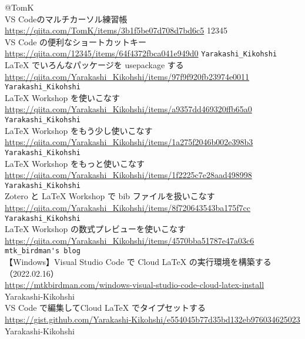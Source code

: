 \documentclass{ltjsarticle}
\begin{document}
\begin{thebibliography}{999}
  @TomK\\
  VS Codeのマルチカーソル練習帳\\
  \url{https://qiita.com/TomK/items/3b1f5be07d708d7bd6c5}
  12345\\
  VS Code の便利なショートカットキー\\
  \url{https://qiita.com/12345/items/64f4372fbca041e949d0}
  \verb|Yarakashi_Kikohshi|\\
  LaTeX でいろんなパッケージを usepackage する\\
  \url{https://qiita.com/Yarakashi_Kikohshi/items/97f9f920fb23974e0011}
  \verb|Yarakashi_Kikohshi|\\
  LaTeX Workshop を使いこなす\\
  \url{https://qiita.com/Yarakashi_Kikohshi/items/a9357dd469320ffb65a0}
  \verb|Yarakashi_Kikohshi|\\
  LaTeX Workshop をもう少し使いこなす\\
  \url{https://qiita.com/Yarakashi_Kikohshi/items/1a275f2046b002e398b3}
  \verb|Yarakashi_Kikohshi|\\
  LaTeX Workshop をもっと使いこなす\\
  \url{https://qiita.com/Yarakashi_Kikohshi/items/1f2225c7e28aad498998}
  \verb|Yarakashi_Kikohshi|\\
  Zotero と LaTeX Workshop で bib ファイルを扱いこなす\\
  \url{https://qiita.com/Yarakashi_Kikohshi/items/8f720643543ba175f7cc}
  \verb|Yarakashi_Kikohshi|\\
  LaTeX Workshop の数式プレビューを使いこなす\\
  \url{https://qiita.com/Yarakashi_Kikohshi/items/4570bba51787e47a03c6}
  \verb|mtk_birdman's blog|\\
  【Windows】Visual Studio Code で Cloud LaTeX の実行環境を構築する（2022.02.16）\\
  \url{https://mtkbirdman.com/windows-visual-studio-code-cloud-latex-install}
  Yarakashi-Kikohshi\\
  VS Code で編集してCloud LaTeX でタイプセットする\\
  \url{https://gist.github.com/Yarakashi-Kikohshi/e554045b77d35bd132eb976034625023}
  Yarakashi-Kikohshi\\

\end{thebibliography}
\end{document}
